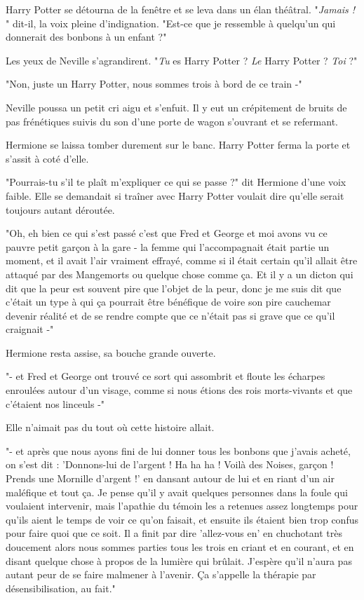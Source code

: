 Harry Potter se détourna de la fenêtre et se leva dans un élan théâtral. "\emph{Jamais !} " dit-il, la voix pleine d'indignation. "Est-ce que je ressemble à quelqu'un qui donnerait des bonbons à un enfant ?"

Les yeux de Neville s'agrandirent. "\emph{Tu}  es Harry Potter ? \emph{Le}  Harry Potter ? \emph{Toi}  ?"

"Non, juste un Harry Potter, nous sommes trois à bord de ce train -"

Neville poussa un petit cri aigu et s'enfuit. Il y eut un crépitement de bruits de pas frénétiques suivis du son d'une porte de wagon s'ouvrant et se refermant.

Hermione se laissa tomber durement sur le banc. Harry Potter ferma la porte et s'assit à coté d'elle.

"Pourrais-tu s'il te plaît m'expliquer ce qui se passe ?" dit Hermione d'une voix faible. Elle se demandait si traîner avec Harry Potter voulait dire qu'elle serait toujours autant déroutée.

"Oh, eh bien ce qui s'est passé c'est que Fred et George et moi avons vu ce pauvre petit garçon à la gare - la femme qui l'accompagnait était partie un moment, et il avait l'air vraiment effrayé, comme si il était certain qu'il allait être attaqué par des Mangemorts ou quelque chose comme ça. Et il y a un dicton qui dit que la peur est souvent pire que l'objet de la peur, donc je me suis dit que c'était un type à qui ça pourrait être bénéfique de voire son pire cauchemar devenir réalité et de se rendre compte que ce n'était pas si grave que ce qu'il craignait -"

Hermione resta assise, sa bouche grande ouverte.

"- et Fred et George ont trouvé ce sort qui assombrit et floute les écharpes enroulées autour d'un visage, comme si nous étions des rois morts-vivants et que c'étaient nos linceuls -"

Elle n'aimait pas du tout où cette histoire allait.

"- et après que nous ayons fini de lui donner tous les bonbons que j'avais acheté, on s'est dit : 'Donnons-lui de l'argent ! Ha ha ha ! Voilà des Noises, garçon ! Prends une Mornille d'argent !' en dansant autour de lui et en riant d'un air maléfique et tout ça. Je pense qu'il y avait quelques personnes dans la foule qui voulaient intervenir, mais l'apathie du témoin les a retenues assez longtemps pour qu'ils aient le temps de voir ce qu'on faisait, et ensuite ils étaient bien trop confus pour faire quoi que ce soit. Il a finit par dire 'allez-vous en' en chuchotant très doucement alors nous sommes parties tous les trois en criant et en courant, et en disant quelque chose à propos de la lumière qui brûlait. J'espère qu'il n'aura pas autant peur de se faire malmener à l'avenir. Ça s'appelle la thérapie par désensibilisation, au fait."

